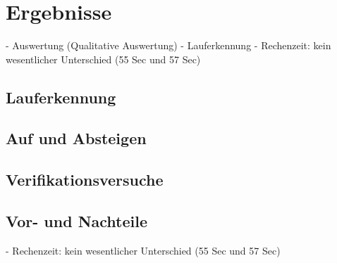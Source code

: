 \chapter{Ergebnisse}


- Auswertung (Qualitative Auswertung)
- Lauferkennung 
- Rechenzeit: kein wesentlicher Unterschied (55 Sec und 57 Sec)


\section{Lauferkennung}





\section{Auf und Absteigen}




\section{Verifikationsversuche}



\section{Vor- und Nachteile}
- Rechenzeit: kein wesentlicher Unterschied (55 Sec und 57 Sec)





 